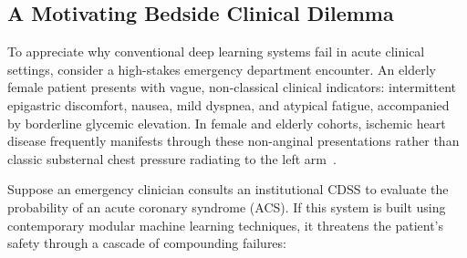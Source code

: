 \documentclass[pdflatex,sn-vancouver-num,referee,lineno]{sn-jnl}
\theoremstyle{thmstyleone}
\theoremstyle{thmstylethree}
\begin{document}
\subsection{A Motivating Bedside Clinical Dilemma}
To appreciate why conventional deep learning systems fail in acute clinical settings, consider a high-stakes emergency department encounter. An elderly female patient presents with vague, non-classical clinical indicators: intermittent epigastric discomfort, nausea, mild dyspnea, and atypical fatigue, accompanied by borderline glycemic elevation. In female and elderly cohorts, ischemic heart disease frequently manifests through these non-anginal presentations rather than classic substernal chest pressure radiating to the left arm~\cite{detrano1989international,seyyed2021underdiagnosis}. 

Suppose an emergency clinician consults an institutional CDSS to evaluate the probability of an acute coronary syndrome (ACS). If this system is built using contemporary modular machine learning techniques, it threatens the patient's safety through a cascade of compounding failures:
\end{document}
